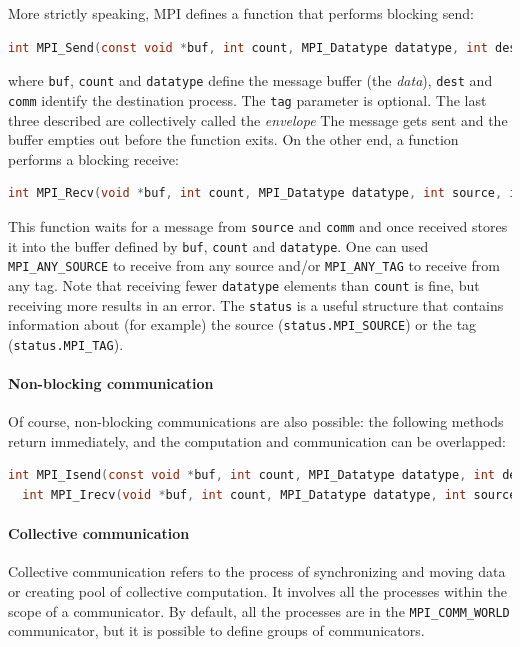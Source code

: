 \documentclass{article}
\begin{document}
More strictly speaking, MPI defines a function that performs blocking send:
\begin{lstlisting}[language=C]
  int MPI_Send(const void *buf, int count, MPI_Datatype datatype, int dest, int tag, MPI_Comm comm)
\end{lstlisting}
where \lstinline{buf}, \lstinline{count} and \lstinline{datatype} define the message buffer (the \textit{data}), \lstinline{dest} and \lstinline{comm} identify the destination process. The \lstinline{tag} parameter is optional. The last three described are collectively called the \textit{envelope} The message gets sent and the buffer empties out before the function exits.
On the other end, a function performs a blocking receive:
\begin{lstlisting}[language=C]
  int MPI_Recv(void *buf, int count, MPI_Datatype datatype, int source, int tag, MPI_Comm comm, MPI_Status *status)
\end{lstlisting}
This function waits for a message from \lstinline{source} and \lstinline{comm} and once received stores it into the buffer defined by \lstinline{buf}, \lstinline{count} and \lstinline{datatype}. One can used \lstinline{MPI_ANY_SOURCE} to receive from any source and/or \lstinline{MPI_ANY_TAG} to receive from any tag. Note that receiving fewer \lstinline{datatype} elements than \lstinline{count} is fine, but receiving more results in an error. The \lstinline{status} is a useful structure that contains information about (for example) the source (\lstinline{status.MPI_SOURCE}) or the tag (\lstinline{status.MPI_TAG}).

\paragraph{Non-blocking communication}
Of course, non-blocking communications are also possible: the following methods return immediately, and the computation and communication can be overlapped:
\begin{lstlisting}[language=C]
  int MPI_Isend(const void *buf, int count, MPI_Datatype datatype, int dest, int tag, MPI_Comm comm, MPI_Request *request)
  int MPI_Irecv(void *buf, int count, MPI_Datatype datatype, int source, int tag, MPI_Comm comm, MPI_Request *request)
\end{lstlisting}

\paragraph{Collective communication}
Collective communication refers to the process of synchronizing and moving data or creating pool of collective computation. It involves all the processes within the scope of a communicator. By default, all the processes are in the \lstinline{MPI_COMM_WORLD} communicator, but it is possible to define groups of communicators.
\end{document}
